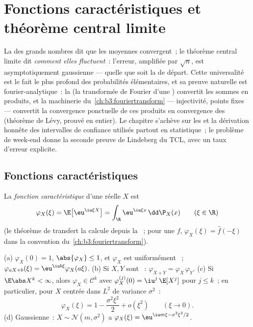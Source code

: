 \chapter{Fonctions caractéristiques et théorème central
limite}\label{ch:b3:clt}

La  des grands nombres dit que les moyennes convergent~; le
théorème central limite dit \emph{comment elles fluctuent}~:
l'erreur, amplifiée par $\sqrt n$, est asymptotiquement
gaussienne --- quelle que soit la  de départ. Cette
universalité est le fait le plus profond des probabilités
élémentaires, et sa preuve naturelle est fourier-analytique~:
la \emph{} (la transformée de Fourier
d'une ) convertit les sommes  en produits, et
la machinerie du~\cref{ch:b3:fouriertransform} ---
injectivité, points fixes  --- convertit la
convergence ponctuelle de ces produits en convergence des
 (théorème de Lévy, prouvé en entier). Le chapitre
s'achève sur les  et la dérivation honnête
des intervalles de confiance utilisés partout en
statistique~; le problème de week-end donne la seconde preuve
de Lindeberg du TCL, avec un taux d'erreur explicite.

\section{Fonctions caractéristiques}

\begin{definition}\label{def:b3:clt:cf}
La \emph{fonction caractéristique} d'une  réelle $X$ est
\[
\varphi_X(\xi) = \E\bigl[\eu^{\iu\xi X}\bigr]
= \int_\R \eu^{\iu\xi x}\,\dd\P_X(x)
\qquad (\xi \in \R)
\]
(le théorème de transfert la calcule depuis la ~; pour une
 $f$, $\varphi_X(\xi) = \hat f(-\xi)$ dans la
convention du~\cref{ch:b3:fouriertransform}).
\end{definition}

\begin{proposition}\label{prop:b3:clt:cfbasics}
(a) $\varphi_X(0) = 1$, $\abs{\varphi_X} \leq 1$, et
$\varphi_X$ est uniformément ~;
$\varphi_{aX + b}(\xi) = \eu^{\iu b\xi}\varphi_X(a\xi)$.
(b) Si $X, Y$ sont \emph{}~:
$\varphi_{X+Y} = \varphi_X\,\varphi_Y$.
(c) Si $\E\abs X^k < \infty$, alors $\varphi_X \in \mathcal
C^k$ avec $\varphi_X^{(j)}(0) = \iu^j\,\E[X^j]$ pour $j \leq
k$~; en particulier, pour $X$ centrée dans $L^2$ de variance
$\sigma^2$~:
\[
\varphi_X(\xi) = 1 - \frac{\sigma^2\xi^2}{2} +
o(\xi^2) \qquad (\xi \to 0).
\]
(d) Gaussienne~: $X \sim \mathcal N(m, \sigma^2)$ a
$\varphi_X(\xi) = \eu^{\iu m\xi - \sigma^2\xi^2/2}$.
\end{proposition}

